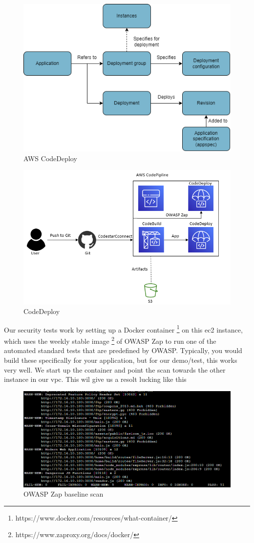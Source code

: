 \vspace{2mm}
\begin{figure}[H]
    \centering
    \includegraphics[width=0.6\columnwidth]{Images/CodeDeploy.drawio.png}
    \caption{AWS CodeDeploy}
    \label{fig: AWS CodeDeploy}
\end{figure}

\vspace{2mm}
\begin{figure}[H]
    \centering
    \includegraphics[width=0.6\columnwidth]{Images/aws-piplin-4.png}
    \caption{CodeDeploy}
    \label{fig: CodeDeploy}
\end{figure}


Our security tests work by setting up a Docker container \footnote{https://www.docker.com/resources/what-container/} on this \acrshort{ec2} instance, which uses the weekly stable image \footnote{https://www.zaproxy.org/docs/docker/} of OWASP Zap to run one of the automated standard tests that are predefined by OWASP. Typically, you would build these specifically for your application, but for our demo/test, this works very well. We start up the container and point the scan towards the other instance in our \acrshort{vpc}. This wil give us a resolt lucking like this
\vspace{2mm}
\begin{figure}[H]
    \centering
    \includegraphics[width=0.8\columnwidth]{Images/owasp-zap-scan.png}
    \caption{OWASP Zap baseline scan}
    \label{fig: OWASP Zap baseline scan}
\end{figure}


